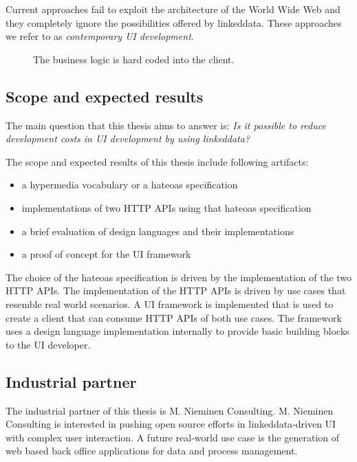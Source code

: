 Current approaches fail to exploit the architecture of the World Wide Web and they completely ignore the possibilities offered by \gls{linkeddata}. These approaches we refer to as \textit{contemporary UI development}.

\begin{figure}[!htb]
  \caption{The business logic is hard coded into the client.}
  \label{fig:hardcoded}
\end{figure}

\subsection{Scope and expected results}\label{sec:scope}
The main question that this thesis aims to answer is: \textit{Is it possible to reduce development costs in UI development by using \gls{linkeddata}?}

The scope and expected results of this thesis include following artifacts:

\begin{itemize}
\item a \gls{hypermedia} vocabulary or a \gls{hateoas} specification
\item implementations of two HTTP APIs using that \gls{hateoas} specification
\item a brief evaluation of design languages and their implementations
\item a proof of concept for the UI framework
\end{itemize}

The choice of the \gls{hateoas} specification is driven by the implementation of the two HTTP APIs. The implementation of the HTTP APIs is driven by use cases that resemble real world scenarios. A UI framework is implemented that is used to create a client that can consume HTTP APIs of both use cases. The framework uses a design language implementation internally to provide basic building blocks to the UI developer.

\subsection{Industrial partner}
The industrial partner of this thesis is M. Nieminen Consulting. M. Nieminen Consulting is interested in pushing open source efforts in \gls{linkeddata}-driven UI with complex user interaction. A future real-world use case is the generation of web based back office applications for data and process management.
